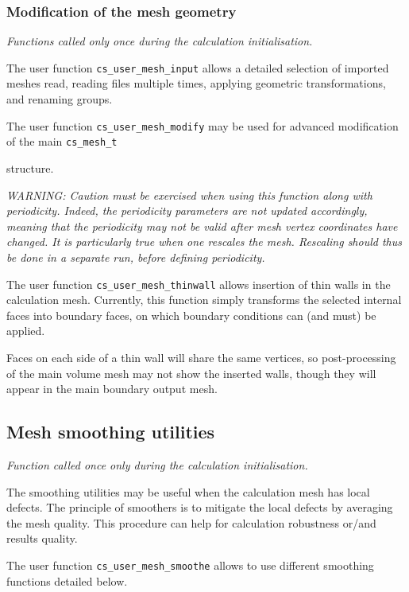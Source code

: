{{{{%
\subsubsection{Modification of the mesh geometry}
\noindent
\textit{Functions called only once during the calculation initialisation.}

The user function \texttt{cs\_user\_mesh\_input} allows a detailed
selection of imported meshes read, reading files multiple times,
applying geometric transformations, and renaming groups.

The user function \texttt{cs\_user\_mesh\_modify} may be used
for advanced modification of the main \texttt{cs\_mesh\_t}} structure.

{\em WARNING: Caution must be exercised when using this function
along with periodicity. Indeed, the periodicity parameters are not
updated accordingly, meaning that the periodicity may not be valid
after mesh vertex coordinates have changed. It is particularly
true when one rescales the mesh. Rescaling should thus be done
in a separate run, before defining periodicity.}

The user function \texttt{cs\_user\_mesh\_thinwall} allows
insertion of thin walls in the calculation mesh. Currently, this
function simply transforms the selected internal faces into boundary
faces, on which boundary conditions can (and must) be applied.

Faces on each side of a thin wall will share the same vertices,
so post-processing of the main volume mesh may not show the
inserted walls, though they will appear in the main boundary
output mesh.

\subsection{Mesh smoothing utilities}
\noindent
\textit{Function called once only during the calculation initialisation.}

The smoothing utilities may be useful when the calculation mesh has local
defects.
The principle of smoothers is to mitigate the local defects by averaging
the mesh quality. This procedure can help for calculation robustness or/and
results quality.

The user function \texttt{cs\_user\_mesh\_smoothe} allows to use different
smoothing functions detailed below.

}}}
